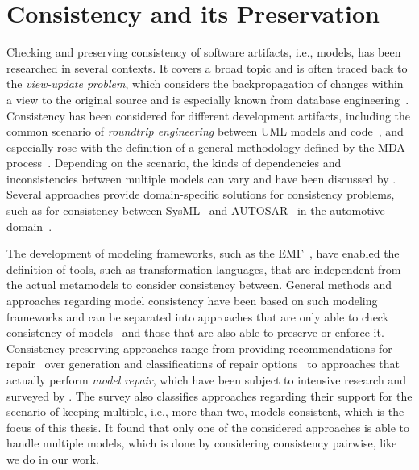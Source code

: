\section{Consistency and its Preservation}

Checking and preserving consistency of software artifacts, i.e., models, has been researched in several contexts.
It covers a broad topic and is often traced back to the \emph{view-update problem}, which considers the backpropagation of changes within a view to the original source and is especially known from database engineering~\cite{bancilhon1981viewUpdate-TDS}.
Consistency has been considered for different development artifacts, including the common scenario of \emph{roundtrip engineering} between \gls{UML} models and code~\cite{dantas2005umlsync-ISPSE}, and especially rose with the definition of a general methodology defined by the \gls{MDA} process~\cite{mda}.
Depending on the scenario, the kinds of dependencies and inconsistencies between multiple models can vary and have been discussed by \textcite{kolovos2008a}. 
Several approaches provide domain-specific solutions for consistency problems, such as for consistency between SysML~\cite{sysml} and AUTOSAR~\cite{scheid2015autosar} in the automotive domain~\cite{giese2010a}.

The development of modeling frameworks, such as the \gls{EMF}~\cite{steinberg2009emf}, have enabled the definition of tools, such as transformation languages, that are independent from the actual metamodels to consider consistency between.
General methods and approaches regarding model consistency have been based on such modeling frameworks and can be separated into approaches that are only able to check consistency of models~\cite{reder2012incrementalchecking} and those that are also able to preserve or enforce it.
Consistency-preserving approaches range from providing recommendations for repair~\cite{ohrndorf2018repairRecommendataions-ICSE} over generation and classifications of repair options~\cite{kretschmer2018repairDiscovery-ICSE} to approaches that actually perform \emph{model repair}, which have been subject to intensive research and surveyed by \textcite{macedo2017ModelRepairClassification-TSE}.
The survey also classifies approaches regarding their support for the scenario of keeping multiple, i.e., more than two, models consistent, which is the focus of this thesis.
It found that only one of the considered approaches is able to handle multiple models, which is done by considering consistency pairwise, like we do in our work.

